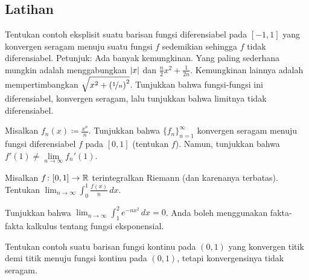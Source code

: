 \subsection{Latihan}

\begin{exercise}
Tentukan contoh eksplisit suatu barisan
fungsi diferensiabel pada $[-1,1]$ yang konvergen seragam menuju
suatu fungsi $f$ sedemikian sehingga $f$ tidak diferensiabel.
Petunjuk:
Ada banyak kemungkinan.
Yang paling sederhana mungkin adalah menggabungkan $\lvert {x} \rvert$ dan $\frac{n}{2}x^2 +
\frac{1}{2n}$.
Kemungkinan lainnya adalah
mempertimbangkan $\sqrt{x^2+{(\nicefrac{1}{n})}^2}$.  Tunjukkan bahwa fungsi-fungsi ini diferensiabel,
konvergen seragam, lalu tunjukkan bahwa limitnya tidak diferensiabel.
\end{exercise}

\begin{exercise}
Misalkan $f_n(x) \coloneqq \frac{x^n}{n}$.  Tunjukkan bahwa $\{ f_n \}_{n=1}^\infty$ konvergen seragam menuju
fungsi diferensiabel $f$ pada $[0,1]$ (tentukan $f$).  Namun, tunjukkan bahwa
$f'(1) \neq \lim\limits_{n\to\infty} f_n'(1)$.
\end{exercise}

%
\begin{exercise}
Misalkan $f \colon [0,1] \to {\mathbb{R}}$ terintegralkan Riemann (dan karenanya terbatas).
Tentukan $\displaystyle \lim_{n\to\infty} \int_0^1 \frac{f(x)}{n} \,dx$.
\end{exercise}

\begin{exercise}
Tunjukkan bahwa
$\displaystyle \lim_{n\to\infty} \int_1^2 e^{-nx^2} \,dx = 0$.  Anda boleh
menggunakan fakta-fakta kalkulus tentang fungsi eksponensial.
\end{exercise}

\begin{exercise}
Tentukan contoh suatu barisan fungsi kontinu pada $(0,1)$ yang konvergen
titik demi titik menuju fungsi kontinu pada $(0,1)$, tetapi konvergensinya tidak
seragam.
\end{exercise}

